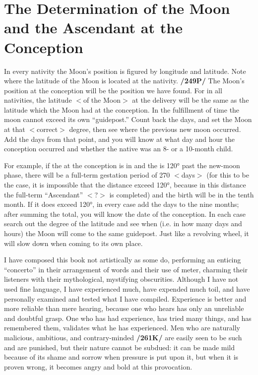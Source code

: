 \section{The Determination of the Moon and the Ascendant at the Conception}

In every nativity the Moon’s position is figured by longitude and latitude. Note where the latitude of the Moon is located at the nativity. \textbf{/249P/} The Moon’s position at the conception will be the position we
have found. For in all nativities, the latitude $<$of the Moon$>$ at the delivery will be the same as the latitude which the Moon had at the conception. In the fulfillment of time the moon cannot exceed its own
“guidepost.” Count back the days, and set the Moon at that $<$correct$>$ degree, then see where the previous new moon occurred. Add the days from that point, and you will know at what day and hour the conception occurred and whether the native was an 8- or a 10-month child.

For example, if the \Sun\xspace at the conception is in \Aries\xspace and the \Moon\xspace is 120° past the new-moon phase, there will be a full-term gestation period of 270 $<$days$>$ (for this to be the case, it is impossible that the distance exceed 120°, because in this distance the full-term “Ascendant” $<$?$>$ is completed) and the birth will be in the tenth month. If it does exceed 120°, in every case add the days to the nine months; after summing the total, you will know the date of the conception. In each case search out the degree of the latitude and see when (i.e. in how many days and hours) the Moon will come to the same guidepost. Just like a revolving wheel, it will slow down when coming to its own place. 

I have composed this book not artistically as some do, performing an enticing “concerto” in their arrangement of words and their use of meter, charming their listeners with their mythological, mystifying
obscurities. Although I have not used fine language, I have experienced much, have expended much toil, and have personally examined and tested what I have compiled. Experience is better and more reliable than mere hearing, because one who hears has only an unreliable and doubtful grasp. One who has had experience, has tried many things, and has remembered them, validates what he has experienced. Men who are naturally malicious, ambitious, and contrary-minded \textbf{/261K/} are easily seen to be such and are punished, but their nature cannot be subdued: it can be made mild because of its shame and sorrow when pressure is put upon it, but when it is proven wrong, it becomes angry and bold at this provocation.

